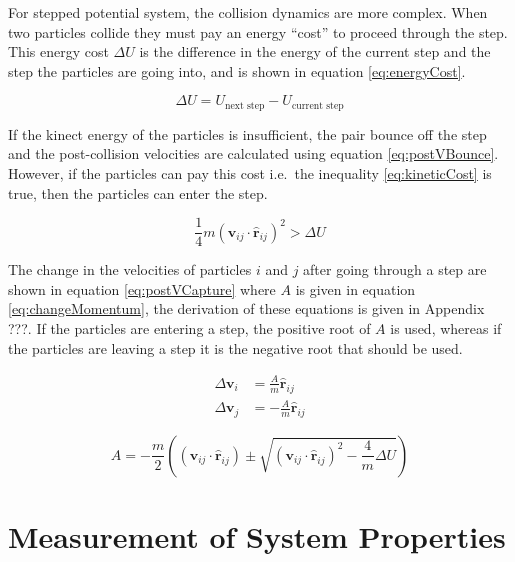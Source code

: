 \message{ !name(main.tex)}\documentclass[12pt]{UoAthesis}
\begin{document}
For stepped potential system, the collision dynamics are more complex.
When two particles collide they must pay an energy ``cost'' to proceed
through the step.  This energy cost $\Delta U$ is the difference in
the energy of the current step and the step the particles are going
into, and is shown in equation \eqref{eq:energyCost}.

\begin{equation}
  \label{eq:energyCost}
  \Delta U = U_{\text{next step}} - U_{\text{current step}}
\end{equation}

If the kinect energy of the particles is insufficient, the pair bounce
off the step and the post-collision velocities are calculated using
equation \eqref{eq:postVBounce}. However, if the particles can pay
this cost i.e.\ the inequality \eqref{eq:kineticCost} is true, then the
particles can enter the step.

\begin{equation}
\label{eq:kineticCost}
  \frac{1}{4}m(\mathbf{v}_{ij}\cdot\mathbf{\hat{r}}_{ij})^2 > \Delta U
\end{equation}

The change in the velocities of particles $i$ and $j$ after going
through a step are shown in equation \eqref{eq:postVCapture} where $A$
is given in equation \eqref{eq:changeMomentum}, the derivation of
these equations is given in Appendix ???.  If the particles are
entering a step, the positive root of $A$ is used, whereas if the
particles are leaving a step it is the negative root that should be
used.

\begin{subequations}
  \label{eq:postVCapture}
  \begin{align}
    \Delta\mathbf{v}_i &= \frac{A}{m} \mathbf{\hat{r}}_{ij} \\
    \Delta\mathbf{v}_j &= -\frac{A}{m}\mathbf{\hat{r}}_{ij}
  \end{align}
\end{subequations}

\begin{equation}
  \label{eq:changeMomentum}
  A = -\frac{m}{2}\left((\mathbf{v}_{ij}\cdot\mathbf{\hat{r}}_{ij}) \pm
  \sqrt{(\mathbf{v}_{ij}\cdot\mathbf{\hat{r}}_{ij})^2 - \frac{4}{m}\Delta U}\right)
\end{equation}
\newpage
\section{Measurement of System Properties}
\end{document}
